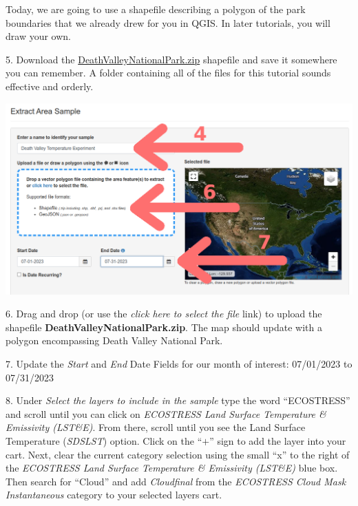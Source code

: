 \documentclass[oneside,a4paper,11pt,explicit]{book}
\begin{document}
Today, we are going to use a shapefile describing a polygon of the park boundaries that we already drew for you in QGIS. In later tutorials, you will draw your own.

\vspace{1em}

5. Download the \href{https://jeremydforsythe.github.io/icecream-tutorials/Tutorial3_AccessingRemoteSensingDataWithAppears/DeathValleyNationalPark.zip}{DeathValleyNationalPark.zip} shapefile and save it somewhere you can remember. A folder containing all of the files for this tutorial sounds effective and orderly. 

\centerline{\includegraphics[width=\textwidth]{ExtractDeathValley.png}}

6. Drag and drop (or use the \textit{click here to select the file} link) to upload the shapefile \textbf{DeathValleyNationalPark.zip}. The map should update with a polygon encompassing Death Valley National Park.

7. Update the \textit{Start} and \textit{End} Date Fields for our month of interest: 07/01/2023 to 07/31/2023


8. Under \textit{Select the layers to include in the sample} type the word ``ECOSTRESS'' and scroll until you can click on \textit{ECOSTRESS Land Surface Temperature \& Emissivity (LST\&E)}. From there, scroll until you see the Land Surface Temperature (\textit{SDS\textunderscore LST}) option. Click on the ``$+$'' sign to add the layer into your cart. Next, clear the current category selection using the small ``x'' to the right of the \textit{ECOSTRESS Land Surface Temperature \& Emissivity (LST\&E)} blue box. Then search for ``Cloud'' and add \textit{Cloud\textunderscore final} from the \textit{ECOSTRESS Cloud Mask Instantaneous} category to your selected layers cart.
\end{document}
